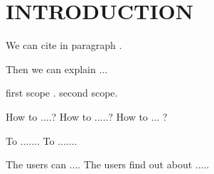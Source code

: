 \chapter{INTRODUCTION}


We can cite in paragraph \citep*{Google2011}. 

Then we can explain ...

\begin{kkuplainsection}
\kkusubsection {} first scope .
\kkusubsection {} second scope. 
\end{kkuplainsection}

\begin{kkuplainsection}
\kkusubsection {}  How to ....?
\kkusubsection {}  How to .....?
\kkusubsection {}  How to ... ?
\end{kkuplainsection}

\begin{kkuplainsection}
\kkusubsection {}  To .......
\kkusubsection {}  To .......
\end{kkuplainsection}

\begin{kkuplainsection}
\kkusubsection {}   The users can ....
\kkusubsection {}   The users find out about ..... 
\end{kkuplainsection}
